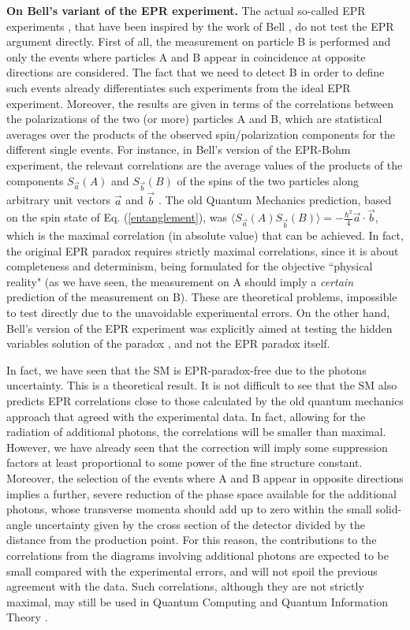 \documentclass[aps,prl,showkeys,showpacs,preprint,groupedaddress,12pt]{revtex4}
\begin{document}
{\bf On Bell's variant of the EPR experiment.} The actual
so-called EPR experiments \cite{Aspect,Laloe}, that have been
inspired by the work of Bell \cite{Bell}, do not test the EPR
argument directly. First of all, the measurement on particle B is
performed and only the events where particles A and B appear in
coincidence at opposite directions are considered. The fact that
we need to detect B in order to define such events already
differentiates such experiments from the ideal EPR experiment.
Moreover, the results are given in terms of the correlations
between the polarizations of the two (or more) particles A and B,
which are statistical averages over the products of the observed
spin/polarization components for the different single events. For
instance, in Bell's version of the EPR-Bohm experiment, the
relevant correlations are the average values of the products of
the components $S_{\vec a}(A)$ and $S_{\vec b}(B)$ of the spins of
the two particles along arbitrary unit vectors $\vec a$ and $\vec
b$ \cite{Bell}. The old Quantum Mechanics prediction, based on the
spin state of Eq. (\ref{entanglement}), was $ \langle S_{\vec
a}(A)S_{\vec b}(B)\rangle =-\frac{\hbar^2}{4}\vec a\cdot\vec b$,
which is the maximal correlation (in absolute value) that can be
achieved. In fact, the original EPR paradox requires strictly
maximal correlations, since it is about completeness and
determinism, being formulated for the objective ``physical
reality" (as we have seen, the measurement on A should imply a
{\it certain} prediction of the measurement on B). These are
theoretical problems, impossible to test directly due to the
unavoidable experimental errors. On the other hand, Bell's version
of the EPR experiment was explicitly aimed at testing the hidden
variables solution of the paradox \cite{Bell}, and not the EPR
paradox itself.

In fact, we have seen that the SM is EPR-paradox-free due to the
photons uncertainty. This is a theoretical result. It is not
difficult to see that the SM also predicts EPR correlations close
to those calculated by the old quantum mechanics approach that
agreed with the experimental data. In fact, allowing for the
radiation of additional photons, the correlations will be smaller
than maximal. However, we have already seen that the correction
will imply some suppression factors at least proportional to some
power of the fine structure constant. Moreover, the selection of
the events where A and B appear in opposite directions implies a
further, severe reduction of the phase space available for the
additional photons, whose transverse momenta should add up to zero
within the small solid-angle uncertainty given by the cross
section of the detector divided by the distance from the
production point. For this reason, the contributions to the
correlations from the diagrams involving additional photons  are
expected to be small compared with the experimental errors, and
will not spoil the previous agreement with the data. Such
correlations, although they are not strictly maximal, may still be
used in Quantum Computing and Quantum Information Theory
\cite{Laloe}.
\end{document}
